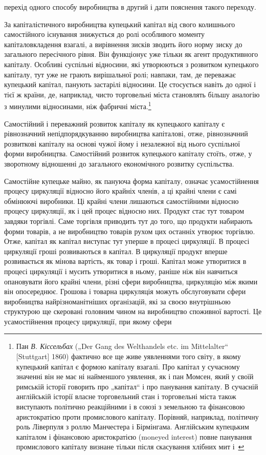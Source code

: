\parcont{}  %
перехід одного способу виробництва в другий і дати пояснення
такого переходу.

За капіталістичного виробництва купецький капітал від свого
колишнього самостійного існування знижується до ролі особливого
моменту капіталовкладення взагалі, а вирівнення зисків
зводить його норму зиску до загального пересічного рівня. Він
функціонує уже тільки як агент продуктивного капіталу. Особливі
суспільні відносини, які утворюються з розвитком купецького
капіталу, тут уже не грають вирішальної ролі; навпаки, там,
де переважає купецький капітал, панують застарілі відносини.
Це стосується навіть до одної і тієї ж країни, де, наприклад,
чисто торговельні міста становлять більшу аналогію з минулими
відносинами, ніж фабричні міста.\footnote{
Пан \emph{В. Кіссельбах} („Der Gang des Welthandels etc. im Mittelalter“ [Stuttgart]
1860) фактично все ще живе уявленнями того світу, в якому купецький
капітал є формою капіталу взагалі. Про капітал у сучасному значенні він не
має ні найменшого уявлення, як і пан Момсен, який у своїй римській історії
говорить про „капітал“ і про панування капіталу. В сучасній англійській історії
власне торговельний стан і торговельні міста також виступають політично
реакційними і в союзі з земельною та фінансовою аристократією проти промислового
капіталу. Порівняй, наприклад, політичну роль Ліверпуля з роллю Манчестера
і Бірмінгама. Англійським купецьким капіталом і фінансовою аристократією
(moneyed interest) повне панування промислового капіталу визнане
тільки після скасування хлібних мит і~
}

Самостійний і переважний розвиток капіталу як купецького
капіталу є рівнозначний непідпорядкуванню виробництва капіталові,
отже, рівнозначний розвиткові капіталу на основі чужої
йому і незалежної від нього суспільної форми виробництва. Самостійний
розвиток купецького капіталу стоїть, отже, у зворотному
відношенні до загального економічного розвитку суспільства.

Самостійне купецьке майно, як пануюча форма капіталу,
означає усамостійнення процесу циркуляції відносно його крайніх
членів, а ці крайні члени є самі обмінюючі виробники. Ці крайні
члени лишаються самостійними відносно процесу циркуляції, як
і цей процес відносно них. Продукт стає тут товаром завдяки
торгівлі. Саме торгівля приводить тут до того, що продукти
набирають форми товарів, а не виробництво товарів рухом цих
останніх утворює торгівлю. Отже, капітал як капітал виступає тут
уперше в процесі циркуляції. В процесі циркуляції гроші розвиваються
в капітал. В циркуляції продукт вперше розвивається
як мінова вартість, як товар і гроші. Капітал може утворитися
в процесі циркуляції і мусить утворитися в ньому, раніше ніж
він навчиться опановувати його крайні члени, різні сфери виробництва,
циркуляцію між якими він опосереднює. Грошова і товарна
циркуляція можуть обслуговувати сфери виробництва найрізноманітніших
організацій, які за своєю внутрішньою структурою
ще скеровані головним чином на виробництво споживної
вартості. Це усамостійнення процесу циркуляції, при якому сфери
\parbreak{}  %
